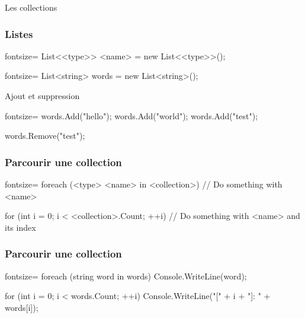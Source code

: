 \begin{frame}
  \begin{center}
    \vspace{1cm}
    {\Huge Les collections}
  \end{center}
\end{frame}

\begin{frame}[fragile]
  \frametitle{Listes}

  \begin{csharpcode*}{fontsize=\normalsize}
    List<<type>> <name> = new List<<type>>();
  \end{csharpcode*}
\end{frame}

\begin{frame}[fragile]
  \begin{csharpcode*}{fontsize=\normalsize}
    List<string> words = new List<string>();
  \end{csharpcode*}

  \pause

  \begin{center}{\large Ajout et suppression}\end{center}
  \begin{csharpcode*}{fontsize=\normalsize}
    words.Add("hello");
    words.Add("world");
    words.Add("test");

    words.Remove("test");
  \end{csharpcode*}
\end{frame}

\begin{frame}[fragile]
  \frametitle{Parcourir une collection}

  \begin{csharpcode*}{fontsize=\normalsize}
    foreach (<type> <name> in <collection>)
    {
      // Do something with <name>
    }

    for (int i = 0; i < <collection>.Count; ++i)
    {
      // Do something with <name> and its index
    }
  \end{csharpcode*}
\end{frame}

\begin{frame}[fragile]
  \frametitle{Parcourir une collection}

  \begin{csharpcode*}{fontsize=\normalsize}
    foreach (string word in words)
    {
      Console.WriteLine(word);
    }

    for (int i = 0; i < words.Count; ++i)
    {
      Console.WriteLine("[" + i + "]: " + words[i]);
    }
  \end{csharpcode*}
\end{frame}


